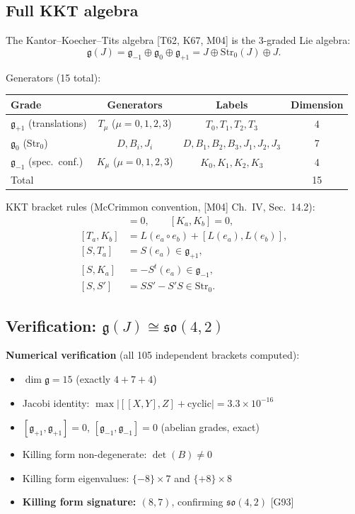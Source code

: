 \subsection{Full KKT algebra}

The Kantor--Koecher--Tits algebra [T62, K67, M04] is the 3-graded Lie algebra:
\begin{equation}
  \mathfrak{g}(J) = \mathfrak{g}_{-1} \oplus \mathfrak{g}_0 \oplus
  \mathfrak{g}_{+1} = J \oplus \mathrm{Str}_0(J) \oplus J.
  \label{eq:kkt-grading}
\end{equation}

Generators (15 total):
\begin{center}
\begin{tabular}{lccc}
  Grade & Generators & Labels & Dimension \\
  \hline
  $\mathfrak{g}_{+1}$ (translations) & $T_\mu$ ($\mu = 0,1,2,3$) & $T_0, T_1, T_2, T_3$ & 4 \\
  $\mathfrak{g}_0$ (Str$_0$) & $D, B_i, J_i$ & $D, B_1, B_2, B_3, J_1, J_2, J_3$ & 7 \\
  $\mathfrak{g}_{-1}$ (spec.\ conf.) & $K_\mu$ ($\mu = 0,1,2,3$) & $K_0, K_1, K_2, K_3$ & 4 \\
  \hline
  Total & & & 15 \\
\end{tabular}
\end{center}

KKT bracket rules (McCrimmon convention, [M04] Ch.\ IV, Sec.\ 14.2):
\begin{align}
  [T_a, T_b] &= 0, \qquad [K_a, K_b] = 0, \\
  [T_a, K_b] &= L(e_a \circ e_b) + [L(e_a), L(e_b)], \\
  [S, T_a] &= S(e_a) \in \mathfrak{g}_{+1}, \\
  [S, K_a] &= -S^t(e_a) \in \mathfrak{g}_{-1}, \\
  [S, S'] &= SS' - S'S \in \mathrm{Str}_0.
\end{align}

\subsection{Verification: $\mathfrak{g}(J) \cong \mathfrak{so}(4,2)$}

\textbf{Numerical verification} (all 105 independent brackets computed):
\begin{itemize}
  \item $\dim \mathfrak{g} = 15$ (exactly $4 + 7 + 4$)
  \item Jacobi identity: $\max |[[X,Y],Z] + \mathrm{cyclic}| = 3.3 \times 10^{-16}$
  \item $[\mathfrak{g}_{+1}, \mathfrak{g}_{+1}] = 0$,
    $[\mathfrak{g}_{-1}, \mathfrak{g}_{-1}] = 0$ (abelian grades, exact)
  \item Killing form non-degenerate: $\det(B) \neq 0$
  \item Killing form eigenvalues: $\{-8\} \times 7$ and $\{+8\} \times 8$
  \item \textbf{Killing form signature: $(8, 7)$}, confirming
    $\mathfrak{so}(4,2)$ [G93]
\end{itemize}

